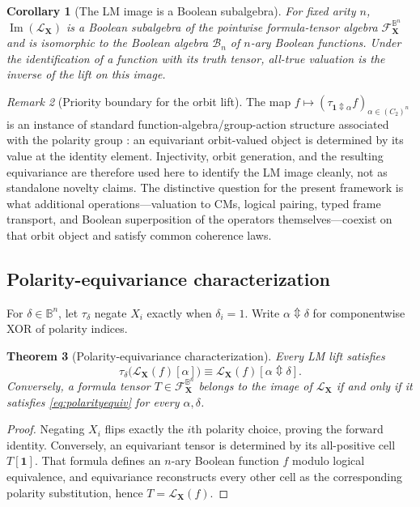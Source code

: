 \documentclass[11pt]{article}
\newtheorem{theorem}{Theorem}[section]
\newtheorem{corollary}[theorem]{Corollary}
\theoremstyle{definition}
\theoremstyle{remark}
\newtheorem{remark}[theorem]{Remark}
\newcommand{\B}{\mathbb B}
\newcommand{\cF}{\mathcal F}
\newcommand{\xor}{\mathbin{\Updownarrow}}
\begin{document}
\begin{corollary}[The LM image is a Boolean subalgebra]
For fixed arity $n$, $\operatorname{Im}(\mathcal L_{\mathbf X})$ is a Boolean subalgebra of the pointwise formula-tensor algebra $\cF_{\mathbf X}^{\B^n}$ and is isomorphic to the Boolean algebra $\mathcal B_n$ of $n$-ary Boolean functions.  Under the identification of a function with its truth tensor, all-true valuation is the inverse of the lift on this image.
\end{corollary}

\begin{remark}[Priority boundary for the orbit lift]
The map $f\mapsto(\tau_{\mathbf1\xor\alpha} f)_{\alpha\in(C_2)^n}$ is an instance of standard function-algebra/group-action structure associated with the polarity group \cite{Burris1981}: an equivariant orbit-valued object is determined by its value at the identity element.  Injectivity, orbit generation, and the resulting equivariance are therefore used here to identify the LM image cleanly, not as standalone novelty claims.  The distinctive question for the present framework is what additional operations---valuation to CMs, logical pairing, typed frame transport, and Boolean superposition of the operators themselves---coexist on that orbit object and satisfy common coherence laws.
\end{remark}



\subsection{Polarity-equivariance characterization}

For $\delta\in\B^n$, let $\tau_\delta$ negate $X_i$ exactly when $\delta_i=1$.  Write $\alpha\xor\delta$ for componentwise XOR of polarity indices.
\begin{theorem}[Polarity-equivariance characterization]
Every LM lift satisfies
\begin{equation}
 \tau_\delta\bigl(\mathcal L_{\mathbf X}(f)[\alpha]\bigr)
 \equiv
 \mathcal L_{\mathbf X}(f)[\alpha\xor\delta].
 \label{eq:polarityequiv}
\end{equation}
Conversely, a formula tensor $T\in\cF_{\mathbf X}^{\B^n}$ belongs to the image of $\mathcal L_{\mathbf X}$ if and only if it satisfies \eqref{eq:polarityequiv} for every $\alpha,\delta$.
\end{theorem}
\begin{proof}
Negating $X_i$ flips exactly the $i$th polarity choice, proving the forward identity.  Conversely, an equivariant tensor is determined by its all-positive cell $T[\mathbf1]$.  That formula defines an $n$-ary Boolean function $f$ modulo logical equivalence, and equivariance reconstructs every other cell as the corresponding polarity substitution, hence $T=\mathcal L_{\mathbf X}(f)$.
\end{proof}
\end{document}
